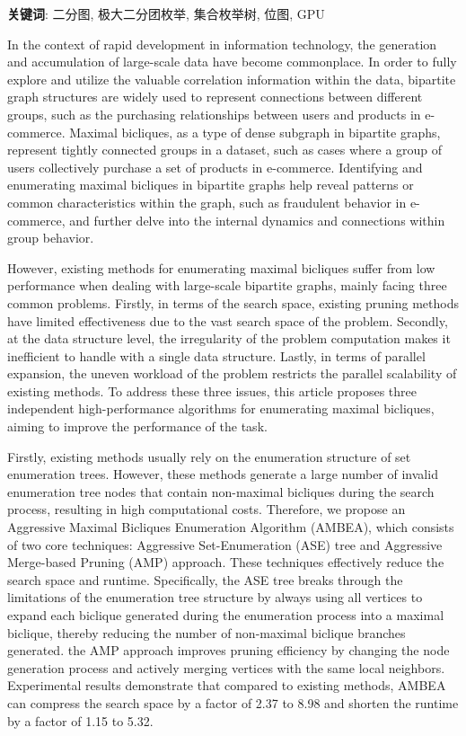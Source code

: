 \vspace{\baselineskip}

\noindent \textbf{关键词}: 二分图, 极大二分团枚举, 集合枚举树, 位图, GPU

\cleardoublepage
{}

In the context of rapid development in information technology, the generation and accumulation of large-scale data have become commonplace. In order to fully explore and utilize the valuable correlation information within the data, bipartite graph structures are widely used to represent connections between different groups, such as the purchasing relationships between users and products in e-commerce. Maximal bicliques, as a type of dense subgraph in bipartite graphs, represent tightly connected groups in a dataset, such as cases where a group of users collectively purchase a set of products in e-commerce. Identifying and enumerating maximal bicliques in bipartite graphs help reveal patterns or common characteristics within the graph, such as fraudulent behavior in e-commerce, and further delve into the internal dynamics and connections within group behavior.

However, existing methods for enumerating maximal bicliques suffer from low performance when dealing with large-scale bipartite graphs, mainly facing three common problems. Firstly, in terms of the search space, existing pruning methods have limited effectiveness due to the vast search space of the problem. Secondly, at the data structure level, the irregularity of the problem computation makes it inefficient to handle with a single data structure. Lastly, in terms of parallel expansion, the uneven workload of the problem restricts the parallel scalability of existing methods. To address these three issues, this article proposes three independent high-performance algorithms for enumerating maximal bicliques, aiming to improve the performance of the task.

Firstly, existing methods usually rely on the enumeration structure of set enumeration trees. However, these methods generate a large number of invalid enumeration tree nodes that contain non-maximal bicliques during the search process, resulting in high computational costs. Therefore, we propose an Aggressive Maximal Bicliques Enumeration Algorithm (AMBEA), which consists of two core techniques: Aggressive Set-Enumeration (ASE) tree and Aggressive Merge-based Pruning (AMP) approach. These techniques effectively reduce the search space and runtime. Specifically, the ASE tree breaks through the limitations of the enumeration tree structure by always using all vertices to expand each biclique generated during the enumeration process into a maximal biclique, thereby reducing the number of non-maximal biclique branches generated. the AMP approach improves pruning efficiency by changing the node generation process and actively merging vertices with the same local neighbors. Experimental results demonstrate that compared to existing methods, AMBEA can compress the search space by a factor of 2.37 to 8.98 and shorten the runtime by a factor of 1.15 to 5.32.

